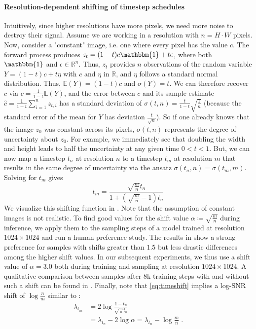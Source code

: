 \paragraph{Resolution-dependent shifting of timestep schedules}
Intuitively, since higher resolutions have more pixels, we need more noise to
destroy their signal. %
Assume we are working in a resolution with $n=H\cdot W$ pixels. Now, consider a
"constant" image, i.e. one where every pixel has the value $c$. The forward
process produces $z_t = (1-t)c \mathbbm{1} + t \epsilon$, where both
$\mathbbm{1}$ and $\epsilon \in \mathbb{R}^n$. Thus, $z_t$ provides $n$
observations of the random variable $Y=(1-t)c + t \eta$ with $c$ and $\eta$ in
$\mathbb{R}$, and $\eta$ follows a standard normal distribution. Thus,
$\mathbb{E}(Y)=(1-t)c$ and $\sigma(Y)=t$. We can therefore recover $c$ via
$c=\frac{1}{1-t}\mathbb{E}(Y)$, and the error between $c$ and its sample
estimate $\hat{c} = \frac{1}{1-t}\sum_{i=1}^n z_{t,i}$ has a standard deviation
of $\sigma(t, n)=\frac{t}{1-t}\sqrt{\frac{1}{n}}$ (because the standard error
of the mean for $Y$ has deviation $\frac{t}{\sqrt{n}}$).  So if one already
knows that the image $z_0$ was constant across its pixels, $\sigma(t, n)$
represents the degree of uncertainty about $z_0$. For example, we immediately
see that doubling the width and height leads to half the uncertainty at any
given time $0 < t < 1$.  But, we can now map a timestep $t_n$ at resolution $n$
to a timestep $t_m$ at resolution $m$ that results in the same degree of
uncertainty via the ansatz $\sigma(t_n, n)=\sigma(t_m, m)$. Solving for $t_m$
gives
\begin{equation}
  \label{eq:timeshift}
t_m = \frac{\sqrt{\frac{m}{n}}t_n}{1+(\sqrt{\frac{m}{n}}-1)t_n}
\end{equation}
\sotaeval
%
We visualize this shifting function in . Note that the
assumption of constant images is not realistic. To find good values for the
shift value $\alpha\coloneq\sqrt{\frac{m}{n}}$ during inference, we apply them to the
sampling steps of a model trained at resolution $1024\times 1024$ and run a
human preference study. The results in  show a strong
preference for samples with shifts greater than $1.5$ but less drastic
differences among the higher shift values. In our subsequent experiments, we
thus use a shift value of $\alpha=3.0$ both during training and sampling at
resolution $1024\times 1024$. A qualitative comparison between samples after 8k
training steps with and without such a shift can be found in
. Finally, note that \eqref{eq:timeshift} implies a 
log-SNR shift of $\log \frac{n}{m}$ similar to \cite{hoogeboom2023simple}: 
 \begin{align}
     \lambda_{t_m} &= 2 \log \frac{1-t_n}{\sqrt{\frac{m}{n}} t_n} \\
     &= \lambda_{t_n} - 2 \log \alpha = \lambda_{t_n} - \log \frac{m}{n} \; .
 \end{align}

